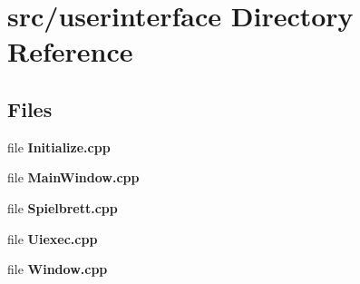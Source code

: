 \section{src/userinterface Directory Reference}
\label{dir_6a9bbfda24ff156040a5bbe170f94215}
\subsection*{Files}
\begin{DoxyCompactItemize}
\item 
file {\bfseries Initialize.\-cpp}
\item 
file {\bfseries Main\-Window.\-cpp}
\item 
file {\bfseries Spielbrett.\-cpp}
\item 
file {\bfseries Uiexec.\-cpp}
\item 
file {\bfseries Window.\-cpp}
\end{DoxyCompactItemize}
